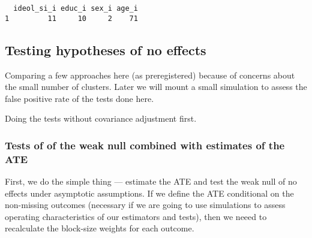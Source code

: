 \documentclass[11pt,]{article}
\newenvironment{Shaded}{\begin{snugshade}}{\end{snugshade}}
\newcommand{\KeywordTok}[1]{\textcolor[rgb]{0.13,0.29,0.53}{\textbf{#1}}}
\newcommand{\NormalTok}[1]{#1}
\newcommand{\OperatorTok}[1]{\textcolor[rgb]{0.81,0.36,0.00}{\textbf{#1}}}
\newcommand{\StringTok}[1]{\textcolor[rgb]{0.31,0.60,0.02}{#1}}
\begin{document}
\begin{Shaded}
\end{Shaded}

\begin{verbatim}
  ideol_si_i educ_i sex_i age_i
1         11     10     2    71
\end{verbatim}

\normalsize

\hypertarget{testing-hypotheses-of-no-effects}{%
\subsection{Testing hypotheses of no
effects}\label{testing-hypotheses-of-no-effects}}

Comparing a few approaches here (as preregistered) because of concerns
about the small number of clusters. Later we will mount a small
simulation to assess the false positive rate of the tests done here.

Doing the tests without covariance adjustment first.

\hypertarget{tests-of-of-the-weak-null-combined-with-estimates-of-the-ate}{%
\subsubsection{Tests of of the weak null combined with estimates of the
ATE}\label{tests-of-of-the-weak-null-combined-with-estimates-of-the-ate}}

First, we do the simple thing --- estimate the ATE and test the weak
null of no effects under asymptotic assumptions. If we define the ATE
conditional on the non-missing outcomes (necessary if we are going to
use simulations to assess operating characteristics of our estimators
and tests), then we neeed to recalculate the block-size weights for each
outcome.

\scriptsize
\end{document}
